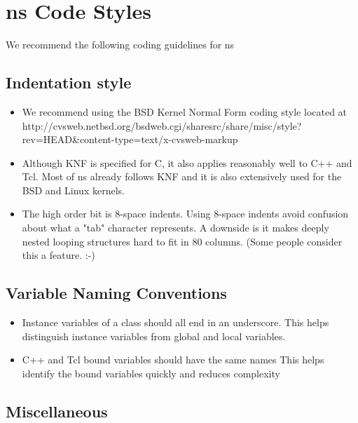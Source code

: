 \chapter{ns Code Styles}
\label{chap:codestyle}

We recommend the following coding guidelines for ns 

\section{Indentation style}
\label{sec:indentationstyle}

\begin{itemize}
\item We recommend using the BSD Kernel Normal Form coding style located at
http://cvsweb.netbsd.org/bsdweb.cgi/sharesrc/share/misc/style?rev=HEAD&content-type=text/x-cvsweb-markup

\item Although KNF is specified for C, it also applies reasonably well to C++ and Tcl.
Most of ns already follows KNF and it is also extensively used for the BSD and
Linux kernels.

\item The high order bit is 8-space indents.
Using 8-space indents avoid confusion about what a "tab" character
represents.  A downside is it makes deeply nested looping structures
hard to fit in 80 columns.  (Some people consider this a feature. :-)
\end{itemize}


\section{Variable Naming Conventions}
\label{sec:variablenamingconventions}

\begin{itemize}
\item Instance variables of a class should all end in an underscore.
This helps distinguish instance variables from global and local
variables.

\item C++ and Tcl bound variables should have the same names
This helps identify the bound variables quickly and reduces complexity
\end{itemize}


\section{Miscellaneous}
\label{sec:miscellaneous}

